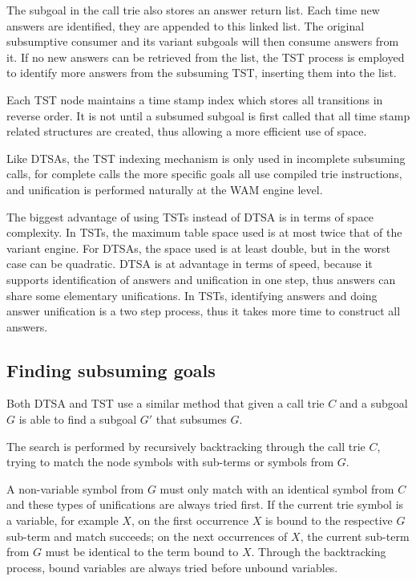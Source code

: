   The subgoal in the call trie also stores an answer return list. Each time new answers are identified, they are appended
  to this linked list. The original subsumptive consumer and its variant subgoals will then consume answers from it. If no
  new answers can be retrieved from the list, the TST process is employed to identify more answers from the subsuming TST,
  inserting them into the list.
  
  Each TST node maintains a time stamp index which stores all transitions in reverse order.
  It is not until a subsumed subgoal is first called that all time stamp related structures are created, thus
  allowing a more efficient use of space.
  
  Like DTSAs, the TST indexing mechanism is only used in incomplete subsuming calls, for complete calls
  the more specific goals all use compiled trie instructions, and unification is performed naturally at
  the WAM engine level.
  
  The biggest advantage of using TSTs instead of DTSA is in terms of space complexity. In TSTs, the maximum table space
  used is at most twice that of the variant engine. For DTSAs, the space used is at least double, but in the worst
  case can be quadratic. DTSA is at advantage in terms of speed, because it supports identification of answers and
  unification in one step, thus answers can share some elementary unifications. In TSTs, identifying answers
  and doing answer unification is a two step process, thus it takes more time to construct all answers. 

\subsection{Finding subsuming goals}

Both DTSA and TST use a similar method that given a call trie $C$ and a subgoal $G$
is able to find a subgoal $G'$ that subsumes $G$.

The search is performed by recursively backtracking through the call trie $C$, trying
to match the node symbols with sub-terms or symbols from $G$.

A non-variable symbol from $G$ must only match with an identical symbol from $C$ and
these types of unifications are always tried first.
If the current trie symbol is a variable, for example $X$, on the first occurrence $X$
is bound to the respective $G$ sub-term
and match succeeds; on the next occurrences of $X$, the current sub-term from $G$ must
be identical to the term bound to $X$. Through the backtracking process, bound variables are
always tried before unbound variables.

